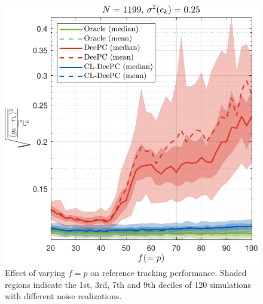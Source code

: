 \begin{figure}[t!]
\begin{center}
\includegraphics[width=\columnwidth]{results/figures/Varying_pf_20-100-41_Nbar_1199_Re_0.25_Ru_1_Rdu_0_Q_100_R_0_dR_10.pdf}    %
\caption{Effect of varying $f=p$ on reference tracking performance. Shaded regions indicate the 1st, 3rd, 7th and 9th deciles of 120 simulations with different noise realizations.}  %
\label{fig:varying_pf}                                 %
\end{center}                                 %
\end{figure}
